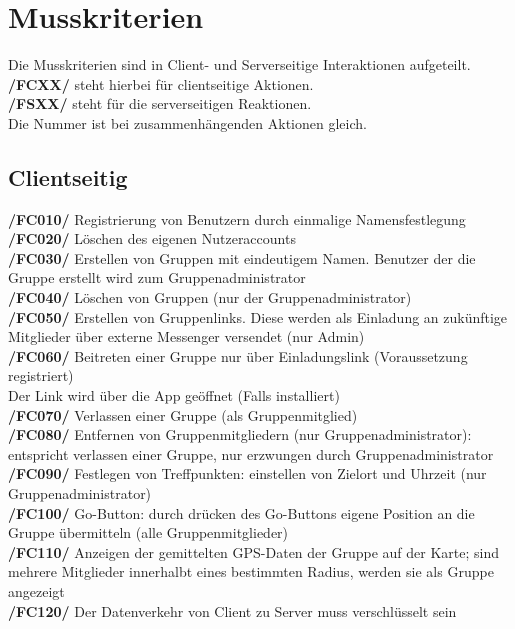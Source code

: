\newpage
\section{Musskriterien}
Die Musskriterien sind in Client- und Serverseitige Interaktionen aufgeteilt.\\
\textbf{/FCXX/} steht hierbei für clientseitige Aktionen.\\
\textbf{/FSXX/} steht für die serverseitigen Reaktionen.\\
Die Nummer ist bei zusammenhängenden Aktionen gleich.\\
\subsection{Clientseitig}
     \textbf{/FC010/} Registrierung von Benutzern durch einmalige Namensfestlegung\\
     \textbf{/FC020/} Löschen des eigenen Nutzeraccounts\\
     \textbf{/FC030/} Erstellen von Gruppen mit eindeutigem Namen. Benutzer der die Gruppe erstellt wird zum Gruppenadministrator\\
     \textbf{/FC040/} Löschen von Gruppen (nur der Gruppenadministrator)   \\
     \textbf{/FC050/} Erstellen von Gruppenlinks. Diese werden als Einladung an zukünftige Mitglieder über externe Messenger versendet (nur Admin)\\
     \textbf{/FC060/} Beitreten einer Gruppe nur über Einladungslink (Voraussetzung registriert) \\
     Der Link wird über die App geöffnet (Falls installiert) \\
     \textbf{/FC070/} Verlassen einer Gruppe (als Gruppenmitglied)\\
     \textbf{/FC080/} Entfernen von Gruppenmitgliedern (nur Gruppenadministrator): entspricht verlassen einer Gruppe, nur erzwungen durch Gruppenadministrator\\
     \textbf{/FC090/} Festlegen von Treffpunkten: einstellen von Zielort und Uhrzeit (nur Gruppenadministrator)\\
     \textbf{/FC100/} Go-Button: durch drücken des Go-Buttons eigene Position an die Gruppe übermitteln (alle Gruppenmitglieder)\\
     \textbf{/FC110/} Anzeigen der gemittelten GPS-Daten der Gruppe auf der Karte; sind mehrere Mitglieder innerhalbt eines bestimmten Radius,
     werden sie als Gruppe angezeigt\\
     \textbf{/FC120/} Der Datenverkehr von Client zu Server muss verschlüsselt sein\\
